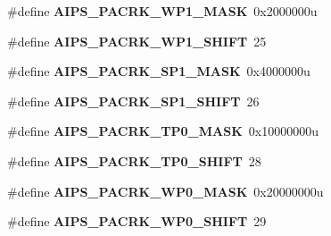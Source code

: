 \begin{DoxyCompactItemize}
\item 
\hypertarget{group___a_i_p_s___register___masks_ga27f20a594ccdd60e94a0dcf573937cbc}{}\#define {\bfseries A\+I\+P\+S\+\_\+\+P\+A\+C\+R\+K\+\_\+\+W\+P1\+\_\+\+M\+A\+S\+K}~0x2000000u\label{group___a_i_p_s___register___masks_ga27f20a594ccdd60e94a0dcf573937cbc}

\item 
\hypertarget{group___a_i_p_s___register___masks_ga6d57363e72571d3694fe8dfeef5685fc}{}\#define {\bfseries A\+I\+P\+S\+\_\+\+P\+A\+C\+R\+K\+\_\+\+W\+P1\+\_\+\+S\+H\+I\+F\+T}~25\label{group___a_i_p_s___register___masks_ga6d57363e72571d3694fe8dfeef5685fc}

\item 
\hypertarget{group___a_i_p_s___register___masks_gaa2a112318ff0026b5978abde4c76e284}{}\#define {\bfseries A\+I\+P\+S\+\_\+\+P\+A\+C\+R\+K\+\_\+\+S\+P1\+\_\+\+M\+A\+S\+K}~0x4000000u\label{group___a_i_p_s___register___masks_gaa2a112318ff0026b5978abde4c76e284}

\item 
\hypertarget{group___a_i_p_s___register___masks_ga700f8a7b64f0c4943958fc5230e0aa5d}{}\#define {\bfseries A\+I\+P\+S\+\_\+\+P\+A\+C\+R\+K\+\_\+\+S\+P1\+\_\+\+S\+H\+I\+F\+T}~26\label{group___a_i_p_s___register___masks_ga700f8a7b64f0c4943958fc5230e0aa5d}

\item 
\hypertarget{group___a_i_p_s___register___masks_ga8c115f9c89041a2fdca48962be0ca305}{}\#define {\bfseries A\+I\+P\+S\+\_\+\+P\+A\+C\+R\+K\+\_\+\+T\+P0\+\_\+\+M\+A\+S\+K}~0x10000000u\label{group___a_i_p_s___register___masks_ga8c115f9c89041a2fdca48962be0ca305}

\item 
\hypertarget{group___a_i_p_s___register___masks_gaf611117bf345f20ab9439c99a65bcafa}{}\#define {\bfseries A\+I\+P\+S\+\_\+\+P\+A\+C\+R\+K\+\_\+\+T\+P0\+\_\+\+S\+H\+I\+F\+T}~28\label{group___a_i_p_s___register___masks_gaf611117bf345f20ab9439c99a65bcafa}

\item 
\hypertarget{group___a_i_p_s___register___masks_ga4bfd4d9c76c24186ed8132d1519e4a67}{}\#define {\bfseries A\+I\+P\+S\+\_\+\+P\+A\+C\+R\+K\+\_\+\+W\+P0\+\_\+\+M\+A\+S\+K}~0x20000000u\label{group___a_i_p_s___register___masks_ga4bfd4d9c76c24186ed8132d1519e4a67}

\item 
\hypertarget{group___a_i_p_s___register___masks_ga8e1697040b37aa4bb80f29a12b3d4c8e}{}\#define {\bfseries A\+I\+P\+S\+\_\+\+P\+A\+C\+R\+K\+\_\+\+W\+P0\+\_\+\+S\+H\+I\+F\+T}~29\label{group___a_i_p_s___register___masks_ga8e1697040b37aa4bb80f29a12b3d4c8e}


\end{DoxyCompactItemize}
